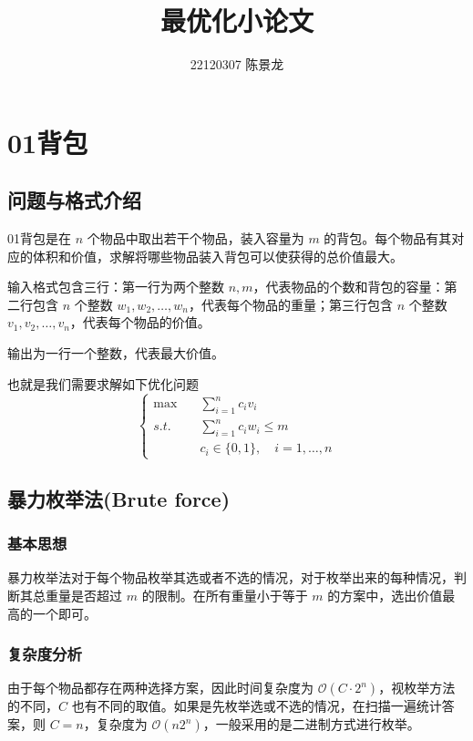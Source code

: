 \documentclass[lang=cn,11pt,a4paper]{elegantpaper}
\title{最优化小论文}
\author{22120307 陈景龙}
\institute{北京交通大学}
\date{\zhtoday}
\newcommand{\subject}{s.t.}
\begin{document}
\maketitle

\begin{abstract}

\end{abstract}

\newpage
{} 
\tableofcontents
\newpage

\section{01背包}
\subsection{问题与格式介绍}
01背包是在 $n$ 个物品中取出若干个物品，装入容量为 $m$ 的背包。每个物品有其对应的体积和价值，求解将哪些物品装入背包可以使获得的总价值最大。

输入格式包含三行：第一行为两个整数 $n, m$，代表物品的个数和背包的容量：第二行包含 $n$ 个整数 $w_1, w_2, \dots, w_n$，代表每个物品的重量；第三行包含 $n$ 个整数 $v_1, v_2, \dots, v_n$，代表每个物品的价值。

输出为一行一个整数，代表最大价值。

也就是我们需要求解如下优化问题 
\begin{equation}
	\begin{cases}
		\max \quad &\sum_{i = 1}^nc_iv_i\\
		\subject &\sum_{i = 1}^nc_iw_i \le m\\
		&c_i \in \{0, 1\}, \quad i = 1, \dots, n
	\end{cases}
\end{equation}

\subsection{暴力枚举法(Brute force)}
\subsubsection{基本思想}
暴力枚举法对于每个物品枚举其选或者不选的情况，对于枚举出来的每种情况，判断其总重量是否超过 $m$ 的限制。在所有重量小于等于 $m$ 的方案中，选出价值最高的一个即可。

\subsubsection{复杂度分析}
由于每个物品都存在两种选择方案，因此时间复杂度为 $\mathcal{O}\left(C \cdot 2^n\right)$，视枚举方法的不同，$C$ 也有不同的取值。如果是先枚举选或不选的情况，在扫描一遍统计答案，则 $C = n$，复杂度为 $\mathcal{O}(n2^n)$，一般采用的是二进制方式进行枚举。
\end{document}
